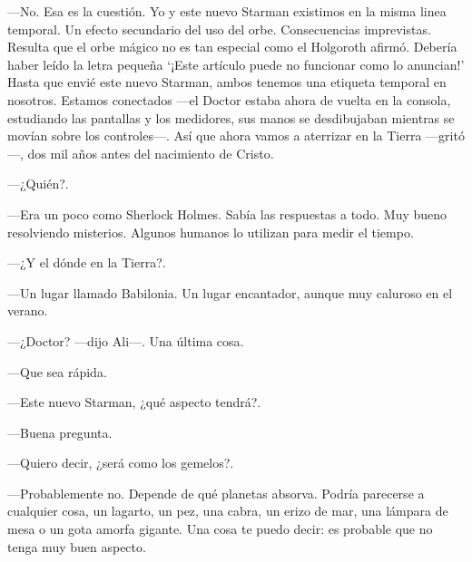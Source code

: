 ---No. Esa es la cuestión. Yo y este nuevo Starman existimos en la misma
linea temporal. Un efecto secundario del uso del orbe. Consecuencias
imprevistas. Resulta que el orbe mágico no es tan especial como el
Holgoroth afirmó. Debería haber leído la letra pequeña `¡Este artículo
puede no funcionar como lo anuncian!' Hasta que envié este nuevo
Starman, ambos tenemos una etiqueta temporal en nosotros. Estamos
conectados ---el Doctor estaba ahora de vuelta en la consola, estudiando
las pantallas y los medidores, sus manos se desdibujaban mientras se
movían sobre los controles---. Así que ahora vamos a aterrizar en la
Tierra ---gritó---, dos mil años antes del nacimiento de Cristo.

---¿Quién?.

---Era un poco como Sherlock Holmes. Sabía las respuestas a todo. Muy
bueno resolviendo misterios. Algunos humanos lo utilizan para medir el
tiempo.

---¿Y el dónde en la Tierra?.

---Un lugar llamado Babilonia. Un lugar encantador, aunque muy caluroso
en el verano.

---¿Doctor? ---dijo Ali---. Una última cosa.

---Que sea rápida.

---Este nuevo Starman, ¿qué aspecto tendrá?.

---Buena pregunta.

---Quiero decir, ¿será como los gemelos?.

---Probablemente no. Depende de qué planetas absorva. Podría parecerse a
cualquier cosa, un lagarto, un pez, una cabra, un erizo de mar, una
lámpara de mesa o un gota amorfa gigante. Una cosa te puedo decir: es
probable que no tenga muy buen aspecto.
